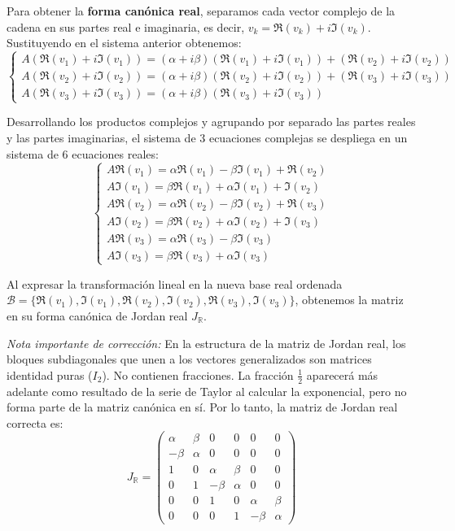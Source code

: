 {    Para obtener la \textbf{forma canónica real}, separamos cada vector complejo de la cadena en sus partes real e imaginaria, es decir, $v_k = \Re(v_k) + i\Im(v_k)$. Sustituyendo en el sistema anterior obtenemos:
    \[
        \begin{cases}
            A (\Re(v_1) + i\Im(v_1)) = (\alpha + i\beta)(\Re(v_1) + i\Im(v_1)) + (\Re(v_2) + i\Im(v_2)) \\
            A (\Re(v_2) + i\Im(v_2)) = (\alpha + i\beta)(\Re(v_2) + i\Im(v_2)) + (\Re(v_3) + i\Im(v_3)) \\
            A (\Re(v_3) + i\Im(v_3)) = (\alpha + i\beta)(\Re(v_3) + i\Im(v_3))
        \end{cases}
    \]

    Desarrollando los productos complejos y agrupando por separado las partes reales y las partes imaginarias, el sistema de 3 ecuaciones complejas se despliega en un sistema de 6 ecuaciones reales:
    \[
        \begin{cases}
            A \Re (v_1) = \alpha \Re(v_1) - \beta \Im(v_1) + \Re(v_2) \\
            A \Im (v_1) = \beta \Re(v_1) + \alpha \Im(v_1) + \Im(v_2) \\
            A \Re (v_2) = \alpha \Re(v_2) - \beta \Im(v_2) + \Re(v_3) \\
            A \Im (v_2) = \beta \Re(v_2) + \alpha \Im(v_2) + \Im(v_3) \\
            A \Re (v_3) = \alpha \Re(v_3) - \beta \Im(v_3) \\
            A \Im (v_3) = \beta \Re(v_3) + \alpha \Im(v_3)
        \end{cases}
    \]

    Al expresar la transformación lineal en la nueva base real ordenada $\mathcal{B} = \{\Re(v_1), \Im(v_1), \Re(v_2), \Im(v_2), \Re(v_3), \Im(v_3)\}$, obtenemos la matriz en su forma canónica de Jordan real $J_\mathbb{R}$. 

    \textit{Nota importante de corrección:} En la estructura de la matriz de Jordan real, los bloques subdiagonales que unen a los vectores generalizados son matrices identidad puras ($I_2$). No contienen fracciones. La fracción $\frac{1}{2}$ aparecerá más adelante como resultado de la serie de Taylor al calcular la exponencial, pero no forma parte de la matriz canónica en sí. Por lo tanto, la matriz de Jordan real correcta es:
    \[
        J_\mathbb{R} = 
        \begin{pmatrix} 
            \alpha & \beta & 0 & 0 & 0 & 0 \\ 
            -\beta & \alpha & 0 & 0 & 0 & 0 \\ 
            1 & 0 & \alpha & \beta & 0 & 0 \\ 
            0 & 1 & -\beta & \alpha & 0 & 0 \\ 
            0 & 0 & 1 & 0 & \alpha & \beta \\ 
            0 & 0 & 0 & 1 & -\beta & \alpha 
        \end{pmatrix}
    \]

}
